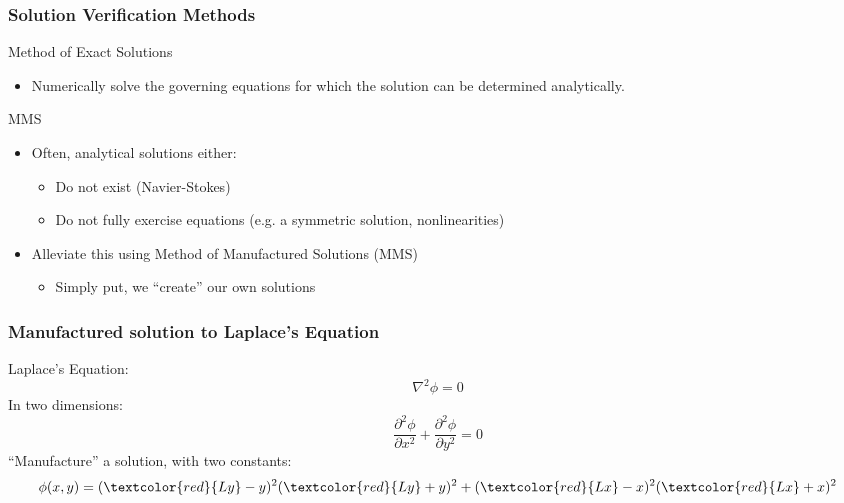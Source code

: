 \documentclass[mathserif]{beamer}
\begin{document}
\begin{frame}
  \frametitle{Solution Verification Methods}

  \begin{block}{Method of Exact Solutions}
    \begin{itemize}
      \item Numerically solve the governing equations for which the solution can be determined analytically.
    \end{itemize}
  \end{block}
  
  \begin{block}{MMS}
    \begin{itemize}
    \item Often, analytical solutions either:
    \begin{itemize}
      \item Do not exist (Navier-Stokes)
      \item Do not fully exercise equations (e.g. a symmetric
	solution, nonlinearities)
    \end{itemize}
    \item Alleviate this using Method of Manufactured Solutions (MMS)
      \begin{itemize}
      \item  Simply put, we ``create'' our own solutions
      \end{itemize}
    \end{itemize}
  \end{block}
  
\end{frame}


\begin{frame}
  \frametitle{Manufactured solution to Laplace's Equation}
  
  Laplace's Equation:
  \begin{equation}
      \nonumber      
    \nabla^2 \phi = 0
  \end{equation}
  In two dimensions:
  \begin{equation}
      \nonumber      
    \frac{\partial^2 \phi}{\partial x^2} + \frac{\partial^2 \phi}{\partial y^2} = 0
  \end{equation}
  \newline
  \newline
  ``Manufacture'' a solution, with two constants:
  \begin{equation}
      \nonumber
    \phi(x,y) = (\textcolor{red}{Ly}-y)^2 (\textcolor{red}{Ly}+y)^2 + (\textcolor{red}{Lx}-x)^2 (\textcolor{red}{Lx}+x)^2
  \end{equation}  

\end{frame}
\end{document}
